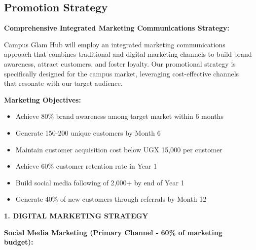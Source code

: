 \subsection{Promotion Strategy}

\textbf{Comprehensive Integrated Marketing Communications Strategy:}

Campus Glam Hub will employ an integrated marketing communications approach that combines traditional and digital marketing channels to build brand awareness, attract customers, and foster loyalty. Our promotional strategy is specifically designed for the campus market, leveraging cost-effective channels that resonate with our target audience.

\vspace{1em}

\textbf{Marketing Objectives:}
\begin{itemize}[leftmargin=2em]
    \item Achieve 80\% brand awareness among target market within 6 months
    \item Generate 150-200 unique customers by Month 6
    \item Maintain customer acquisition cost below UGX 15,000 per customer
    \item Achieve 60\% customer retention rate in Year 1
    \item Build social media following of 2,000+ by end of Year 1
    \item Generate 40\% of new customers through referrals by Month 12
\end{itemize}

\vspace{1em}

\textbf{1. DIGITAL MARKETING STRATEGY}

\textbf{Social Media Marketing (Primary Channel - 60\% of marketing budget):}

